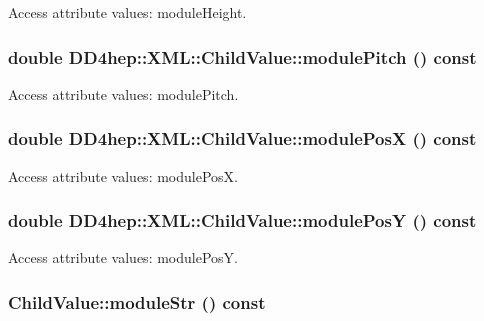 Access attribute values: moduleHeight. \hypertarget{struct_d_d4hep_1_1_x_m_l_1_1_child_value_a3ee27bff8cbf9f5ae86fa7853ceede91}{
\subsubsection[{modulePitch}]{\setlength{\rightskip}{0pt plus 5cm}double DD4hep::XML::ChildValue::modulePitch () const}}
\label{struct_d_d4hep_1_1_x_m_l_1_1_child_value_a3ee27bff8cbf9f5ae86fa7853ceede91}


Access attribute values: modulePitch. \hypertarget{struct_d_d4hep_1_1_x_m_l_1_1_child_value_a7f99b1eaeb74e8b82682a9c63c3b7c70}{
\subsubsection[{modulePosX}]{\setlength{\rightskip}{0pt plus 5cm}double DD4hep::XML::ChildValue::modulePosX () const}}
\label{struct_d_d4hep_1_1_x_m_l_1_1_child_value_a7f99b1eaeb74e8b82682a9c63c3b7c70}


Access attribute values: modulePosX. \hypertarget{struct_d_d4hep_1_1_x_m_l_1_1_child_value_a59bc9319ed923a76164e85800d1241a6}{
\subsubsection[{modulePosY}]{\setlength{\rightskip}{0pt plus 5cm}double DD4hep::XML::ChildValue::modulePosY () const}}
\label{struct_d_d4hep_1_1_x_m_l_1_1_child_value_a59bc9319ed923a76164e85800d1241a6}


Access attribute values: modulePosY. \hypertarget{struct_d_d4hep_1_1_x_m_l_1_1_child_value_a37d7e7fc7f3bba7c2ce598dc1599417f}{
\subsubsection[{moduleStr}]{ ChildValue::moduleStr () const}}
\label{struct_d_d4hep_1_1_x_m_l_1_1_child_value_a37d7e7fc7f3bba7c2ce598dc1599417f}


